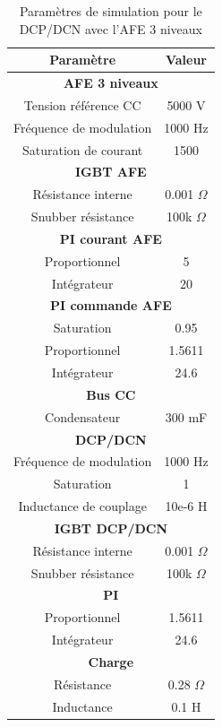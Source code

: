 \documentclass[11pt,letterpaper,final]{report}
\begin{document}
\begin{table}[htb]
\centering
\begin{tabular}{|c|c|} 
  \hline
  Paramètre & Valeur  \\
  \hline\hline \hline
  \multicolumn{2}{|c|}{\textbf{AFE 3 niveaux}}\\ \hline \hline 
  Tension référence CC & 5000 V\\ \hline
  Fréquence de modulation & 1000 Hz \\ \hline
  Saturation de courant& 1500 \\ \hline \hline
  \multicolumn{2}{|c|}{\textbf{IGBT AFE}}\\ \hline
  Résistance interne & 0.001 $\Omega$\\
  Snubber résistance & 100k $\Omega$\\ \hline \hline
   \multicolumn{2}{|c|}{\textbf{PI courant AFE}}\\ \hline
  Proportionnel & 5 \\
  Intégrateur & 20 \\ \hline \hline
  \multicolumn{2}{|c|}{\textbf{PI commande AFE}}\\ \hline
  Saturation & 0.95\\
  Proportionnel & 1.5611 \\
  Intégrateur & 24.6 \\ \hline \hline
  \multicolumn{2}{|c|}{\textbf{Bus CC}}\\ \hline
  Condensateur & 300 mF\\
  \hline \hline \hline
  
  \multicolumn{2}{|c|}{\textbf{DCP/DCN}}\\ \hline \hline
  Fréquence de modulation & 1000 Hz\\ \hline
  Saturation & 1 \\ \hline
  Inductance de couplage & 10e-6 H \\ \hline \hline
  \multicolumn{2}{|c|}{\textbf{IGBT DCP/DCN}}\\ \hline
  Résistance interne & 0.001 $\Omega$\\
  Snubber résistance & 100k $\Omega$\\ \hline \hline
   \multicolumn{2}{|c|}{\textbf{PI}}\\ \hline
  Proportionnel & 1.5611 \\
  Intégrateur & 24.6 \\ \hline \hline
  \multicolumn{2}{|c|}{\textbf{Charge}}\\ \hline
  Résistance & 0.28 $\Omega$\\
  Inductance & 0.1 H \\
  \hline
\end{tabular}
\caption{Paramètres de simulation pour le DCP/DCN avec l'AFE 3 niveaux}
\label{p_AF_DCP}
\end{table}
\end{document}
